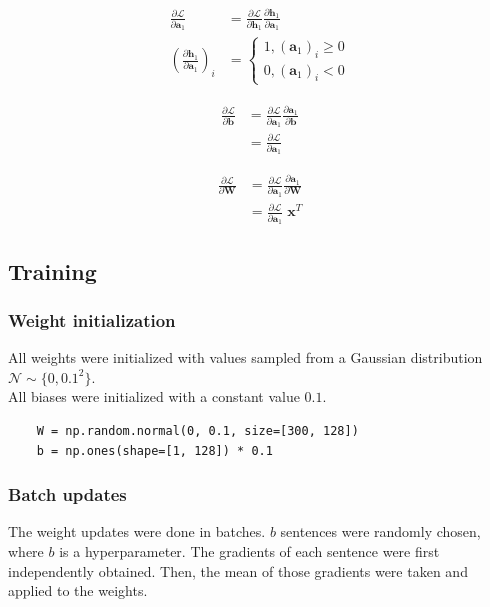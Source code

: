 \documentclass{article}
\numberwithin{equation}{section}
\begin{document}
\begin{equation}
\begin{split}
	\frac{\partial\mathcal{L}}{\partial\bm{a}_1}
		&= \frac{\partial\mathcal{L}}{\partial\bm{h}_1} \frac{\partial\bm{h}_1}{\partial\bm{a}_1} \\
	\left(\frac{\partial\bm{h}_1}{\partial\bm{a}_1}\right)_i
		&= \left\{\begin{matrix}
			1, (\bm{a}_1)_i \geq 0 \\
			0, (\bm{a}_1)_i < 0
			\end{matrix}\right.
\end{split}
\end{equation}

\begin{equation}
\begin{split}
	\frac{\partial\mathcal{L}}{\partial\bm{b}}
		&= \frac{\partial\mathcal{L}}{\partial\bm{a}_1} \frac{\partial\bm{a}_1}{\partial\bm{b}} \\
		&= \frac{\partial\mathcal{L}}{\partial\bm{a}_1}
\end{split}
\end{equation}

\begin{equation}
\begin{split}
	\frac{\partial\mathcal{L}}{\partial\bm{W}}
		&= \frac{\partial\mathcal{L}}{\partial\bm{a}_1} \frac{\partial\bm{a}_1}{\partial\bm{W}} \\
		&= \frac{\partial\mathcal{L}}{\partial\bm{a}_1} \;\bm{x}^T
\end{split}
\end{equation}

\subsection{Training}
\subsubsection{Weight initialization}
All weights were initialized with values sampled from a Gaussian distribution $\mathcal{N} \sim \{0, 0.1^2\}$.\\
All biases were initialized with a constant value $0.1$.

\begin{verbatim}
    W = np.random.normal(0, 0.1, size=[300, 128])
    b = np.ones(shape=[1, 128]) * 0.1
\end{verbatim}

\subsubsection{Batch updates}
The weight updates were done in batches. $b$ sentences were randomly chosen, where $b$ is a hyperparameter. The gradients of each sentence were first independently obtained. Then, the mean of those gradients were taken and applied to the weights.\\
\end{document}
